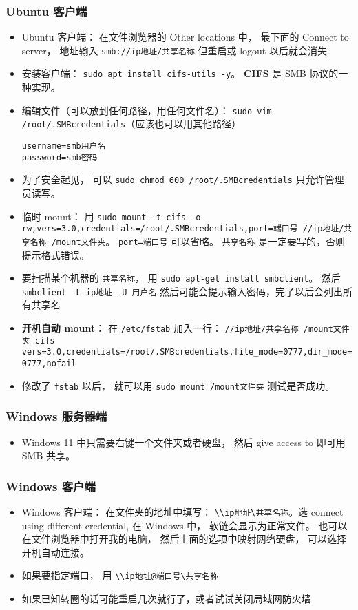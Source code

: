 \subsubsection{Ubuntu 客户端}
\begin{itemize}
\item Ubuntu 客户端： 在文件浏览器的 Other locations 中， 最下面的 Connect to server， 地址输入 \verb`smb://ip地址/共享名称` 但重启或 logout 以后就会消失
\item 安装客户端： \verb`sudo apt install cifs-utils -y`。 \textbf{CIFS} 是 SMB 协议的一种实现。
\item 编辑文件（可以放到任何路径，用任何文件名）： \verb`sudo vim /root/.SMBcredentials`（应该也可以用其他路径）
\begin{lstlisting}[language=none]
username=smb用户名
password=smb密码
\end{lstlisting}
\item 为了安全起见， 可以 \verb`sudo chmod 600 /root/.SMBcredentials` 只允许管理员读写。
\item 临时 mount： 用 \verb`sudo mount -t cifs -o rw,vers=3.0,credentials=/root/.SMBcredentials,port=端口号 //ip地址/共享名称 /mount文件夹`。 \verb`port=端口号` 可以省略。 \verb`共享名称` 是一定要写的，否则提示格式错误。
\item 要扫描某个机器的 \verb`共享名称`， 用 \verb`sudo apt-get install smbclient`。 然后 \verb`smbclient -L ip地址 -U 用户名` 然后可能会提示输入密码，完了以后会列出所有共享名
\item \textbf{开机自动 mount}： 在 \verb`/etc/fstab` 加入一行： \verb`//ip地址/共享名称 /mount文件夹 cifs vers=3.0,credentials=/root/.SMBcredentials,file_mode=0777,dir_mode=0777,nofail`
\item 修改了 \verb`fstab` 以后， 就可以用 \verb`sudo mount /mount文件夹` 测试是否成功。
\end{itemize}

\subsubsection{Windows 服务器端}
\begin{itemize}
\item Windows 11 中只需要右键一个文件夹或者硬盘， 然后 give access to 即可用 SMB 共享。
\end{itemize}

\subsubsection{Windows 客户端}
\begin{itemize}
\item Windows 客户端： 在文件夹的地址中填写： \verb`\\ip地址\共享名称`。选 connect using different credential, 在 Windows 中， 软链会显示为正常文件。 也可以在文件浏览器中打开我的电脑， 然后上面的选项中映射网络硬盘， 可以选择开机自动连接。
\item 如果要指定端口， 用 \verb`\\ip地址@端口号\共享名称`
\item 如果已知转圈的话可能重启几次就行了，或者试试关闭局域网防火墙
\end{itemize}

